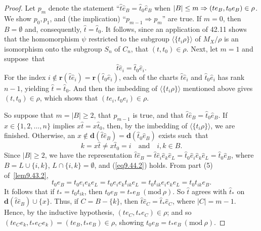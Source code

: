 \documentclass{surv-l}
\numberwithin{equation}{section}
\numberwithin{table}{section}
\numberwithin{figure}{section}
\theoremstyle{definition}
\begin{document}
\begin{proof}Let $p_{m}$ denote the statement
``$\widehat{t}\widehat{e}_{B}=\widehat{t}_{0}\widehat{e}_{B}$ when
$|B|\leq m \Rightarrow (te_{B}, t_{0}e_{B})\break \in\rho$. We show
$p_{0}, p_{1}$, and (the implication) ``$p_{m-1}\Rightarrow
p_{m}$'' are true. If $m=0$, then $B=\emptyset$ and,
consequently, $\widehat{t}=\widehat{t}_{0}$. It follows, since an
application of 42.11 shows that the homomorphism $\psi$ restricted
to the subgroup $\langle\{t_{i}\rho\}\rangle$ of $M_{X}/\rho$ is
an isomorphism onto the subgroup $S_{n}$ of $C_{n}$, that $(t,
t_{0})\in\rho$. Next, let $m=1$ and suppose~that
\[
\widehat{t}\widehat{e}_{i}=\widehat{t}_{0}\widehat{e}_{i}.
\]
For the index $i\not\in
\mathbf{r}(\widehat{t}\widehat{e}_{i})=\mathbf{r}(\widehat{t}_{0}\widehat{e}_{i})$,
each of the charts $\widehat{t}\widehat{e}_{i}$ and
$\widehat{t}_{0}\widehat{e}_{i}$ has rank $n -1$, yielding
$\widehat{t}=\widehat{t}_{0}$. And then the imbedding of
$\langle\{t_{i}\rho\}\rangle$ mentioned above gives $(t,
t_{0})\in\rho$, which shows that $(te_{i}, t_{0}e_{i})\in\rho$.

So suppose that $m=|B|\geq 2$, that $p_{m-1}$ is true, and that
$\widehat{t}\widehat{e}_{B}=\widehat{t}_{0}\widehat{e}_{B}$. If
$x\in\{1,2,\ldots, n\}$ implies $x\widehat{t}=x\widehat{t}_{0}$,
then, by the imbedding of $\langle \{t_{i}\rho\}\rangle$, we are
finished. Otherwise, an $x\not\in
\mathbf{d}(\widehat{t}\widehat{e}_{B})=\mathbf{d}(\widehat{t}_{0}\widehat{e}_{B})$
exists such~that
\begin{equation}\label{eq9.44.2}
k=x\widehat{t}\neq x\widehat{t}_{0}=i\quad \mathrm{and}\quad i,k \in B.
\end{equation}
Since $|B|\geq 2$, we have the representation
$\widehat{t}\widehat{e}_{B}=\widehat{t}\widehat{e}_{i}\widehat{e}_{k}\widehat{e}_{L}
=\widehat{t}_{0}\widehat{e}_{i}\widehat{e}_{k}\widehat{e}_{L}=\widehat{t}_{0}\widehat{e}_{B}$,
where $B= L \cup \{i, k\}$, $L\cap\{i, k\}=\emptyset$, and
(\ref{eq9.44.2}) holds. From part (5) of~\ref{lem9.43.2},
\[
t_{0}e_{B}=t_{0}e_{i}e_{k}e_{L}=t_{0}e_{i}e_{k}t_{ik}e_{L}=t_{0}t_{ik}e_{i}e_{k}e_{L}=t_{0}t_{ik}e_{B}.
\]
It follows that if $t_{\ast}=t_{0}t_{ik}$, then
$t_{0}e_{B}=t_{\ast}e_{B}\ (\mathrm{mod}\ \rho)$. So $\widehat{t}$
agrees with $\widehat{t}_{\ast}$ on
$\mathbf{d}(\widehat{t}\widehat{e}_{B})\cup\{x\}$. Thus, if
$C=B-\{k\}$, then
$\widehat{t}\widehat{e}_{C}=\widehat{t}_{\ast}\widehat{e}_{C}$,
where $|C|=m-1$. Hence, by the inductive hypothesis, $(te_{C},
t_{\ast}e_{C})\in\rho$; and so $(te_{C}e_{k}, t_{\ast}e_{C}e_{k})
=(te_{B}, t_{\ast}e_{B})\in\rho$, showing
$t_{0}e_{B}=t_{\ast}e_{B}\ (\mathrm{mod}\ \rho).$
\end{proof}
\end{document}
